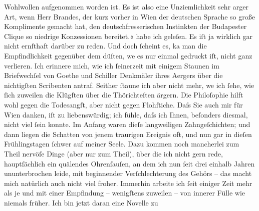 \begin{ledgroupsized}[t]{13cm}
{{{                     Wohlwollen aufgenommen worden ist. Es ist also eine Unziemlichkeit sehr arger
                     Art, wenn Herr Brandes, der kurz vorher in
                        Wien der deutschen Sprache so große
                     Komplimente gemacht hat, den deutschfresserischen Instinkten der Budapester Clique so niedrige Konzessionen
                     bereitet.«}}}\label{K_L01034_4h} habe ich geleſen. Es iſt ja wirklich gar nicht
               ernſthaft darüber zu reden. Und doch ſcheint es, ka{\geminationn} man
               die Empfindlichkeit gegenüber dem dü{\geminationm}ſten, we{\geminationn} es nur einmal gedruckt iſt, nicht ganz verlieren. Ich
               erinnere mich, wie ich ſeinerzeit mit einigem Staunen im Briefwechſel von Goethe und Schiller Denkmäler ihres Aergers über die nichtigſten Scribenten antraf.
               Seither ſtaune ich {\pb}aber nicht mehr, we{\geminationn} ich ſehe, wie ſich zuweilen die Klügſten über die
               Thörichteſten ärgern. Die Philoſophie hilft wohl gegen die Todesangſt, aber nicht
               gegen Flohſtiche.\pend
           \pstart
           Daſs Sie auch mir für Wien danken, iſt zu
               liebenswürdig; ich fühle, daſs ich Ihnen, beſonders diesmal, nicht viel ſein konnte.
               Im Anfang waren dieſe langweiligen Zahngeſchichten; und dann liegen die Schatten von
               jenem traurigen Ereignis oft, und nun gar in dieſen Frühlingstagen ſchwer auf meiner
               Seele. Dazu kommen noch mancherlei zum {\pb}Theil
               nervöſe Dinge (aber nur zum Theil), über die ich nicht gern rede, hauptſächlich ein
               quälendes Ohrenſauſen, an dem ich nun ſeit drei einhalb Jahren ununterbrochen leide,
               mit beginnender Verſchlechterung des Gehörs – das macht mich natürlich auch nicht
               viel froher. Immerhin arbeite ich ſeit einiger Zeit mehr als je und mit einer
               Empfindung – wenigſtens zuweilen – von innerer Fülle wie niemals früher. Ich bin
               jetzt daran eine Novelle zu

\end{ledgroupsized}
